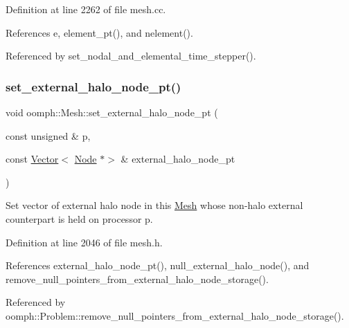Definition at line 2262 of file mesh.\+cc.



References e, element\+\_\+pt(), and nelement().



Referenced by set\+\_\+nodal\+\_\+and\+\_\+elemental\+\_\+time\+\_\+stepper().

\mbox{\label{classoomph_1_1Mesh_a5dc026d4fc9297ea4e72bcd2307d29f1}} 
\subsubsection{\texorpdfstring{set\+\_\+external\+\_\+halo\+\_\+node\+\_\+pt()}{set\_external\_halo\_node\_pt()}}
{\footnotesize\ttfamily void oomph\+::\+Mesh\+::set\+\_\+external\+\_\+halo\+\_\+node\+\_\+pt (\begin{DoxyParamCaption}\item[{const unsigned \&}]{p,  }\item[{const \hyperlink{classoomph_1_1Vector}{Vector}$<$ \hyperlink{classoomph_1_1Node}{Node} $\ast$$>$ \&}]{external\+\_\+halo\+\_\+node\+\_\+pt }\end{DoxyParamCaption})\hspace{0.3cm}{\ttfamily [inline]}}



Set vector of external halo node in this \hyperlink{classoomph_1_1Mesh}{Mesh} whose non-\/halo external counterpart is held on processor p. 



Definition at line 2046 of file mesh.\+h.



References external\+\_\+halo\+\_\+node\+\_\+pt(), null\+\_\+external\+\_\+halo\+\_\+node(), and remove\+\_\+null\+\_\+pointers\+\_\+from\+\_\+external\+\_\+halo\+\_\+node\+\_\+storage().



Referenced by oomph\+::\+Problem\+::remove\+\_\+null\+\_\+pointers\+\_\+from\+\_\+external\+\_\+halo\+\_\+node\+\_\+storage().

\mbox{\label{classoomph_1_1Mesh_a3220b47346e18322fbb2517a1879cd7b}} 
